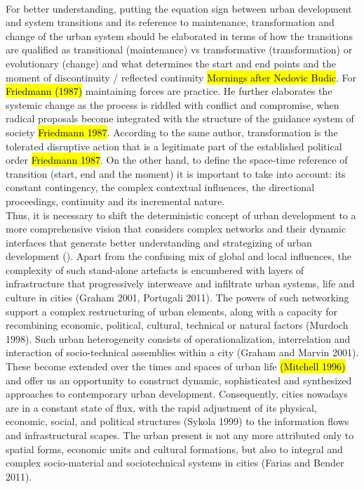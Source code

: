 \documentclass[11pt]{report}
\begin{document}
\\
For better understanding, putting the equation sign between urban development and system transitions and its reference to maintenance, transformation and change of the urban system should be elaborated in terms of how the transitions are qualified as transitional (maintenance) vs transformative (transformation) or evolutionary (change) and what determines the start and end points and the moment of discontinuity / reflected continuity \hl{Mornings after Nedovic Budic}.
For \hl{Friedmann (1987)} maintaining forces are practice.\footnotemark
{}
He further elaborates the systemic change as the process is riddled with conflict and compromise, when radical proposals become integrated with the structure of the guidance system of society \hl{Friedmann 1987}. According to the same author, transformation is the tolerated disruptive action that is a legitimate part of the established political order \hl{Friedmann 1987}.
On the other hand, to define the space-time reference of transition (start, end and the moment) it is important to take into account: its constant contingency, the complex contextual influences, the directional proceedings, continuity and its incremental nature.
\\    
Thus, it is necessary to shift the deterministic concept of urban development to a more comprehensive vision that considers complex networks and their dynamic interfaces that generate better understanding and strategizing of urban development (\cite{Huang 2012}). Apart from the confusing mix of global and local influences, the complexity of such stand-alone artefacts is encumbered with layers of infrastructure that progressively interweave and infiltrate urban systems, life and culture in cities (Graham 2001, Portugali 2011). The powers of such networking support a complex restructuring of urban elements, along with a capacity for recombining economic, political, cultural, technical or natural factors (Murdoch 1998). Such urban heterogeneity consists of operationalization, interrelation and interaction of socio-technical assemblies within a city (Graham and Marvin 2001). These become extended over the times and spaces of urban life \hl{(Mitchell 1996)} and offer us an opportunity to construct dynamic, sophisticated and synthesized approaches to contemporary urban development. Consequently, cities nowadays are in a constant state of flux, with the rapid adjustment of its physical, economic, social, and political structures (Sykola 1999) to the information flows and infrastructural scapes. The urban present is not any more attributed only to spatial forms, economic units and cultural formations, but also to integral and complex socio-material and sociotechnical systems in cities (Farias and Bender 2011). 
\end{document}
